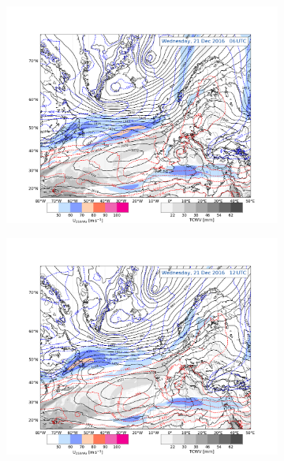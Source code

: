 \begin{figure}[ht!]
	\begin{subfigure}[b]{0.49\textwidth}
		\includegraphics[trim={4.2cm 0cm 4.3cm 5.1cm},clip,
		width=\textwidth]{./fig_Geopot_Jet/20161221_06}
		\caption{} \label{fig:GP21_06}
	\end{subfigure}
	\begin{subfigure}[b]{0.49\textwidth}
		\includegraphics[trim={4.2cm 0cm 4.3cm 5.1cm},clip,
		width=\textwidth]{./fig_Geopot_Jet/20161221_12}
		\caption{} \label{fig:GP21}
	\end{subfigure}
	\begin{subfigure}[b]{0.49\textwidth}

\end{subfigure}
\end{figure}
